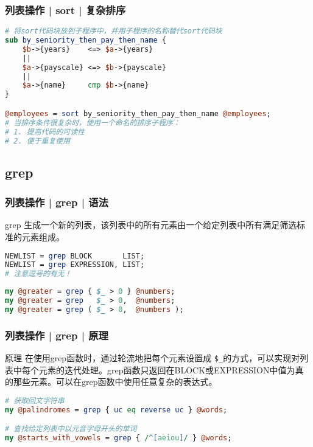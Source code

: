 \begin{frame}[fragile]
  \frametitle{列表操作 | sort | 复杂排序}
\begin{lstlisting}[language=Perl]
# 将sort代码块放到子程序中，并用子程序的名称替代sort代码块
sub by_seniority_then_pay_then_name {
    $b->{years}    <=> $a->{years}
    ||
    $a->{payscale} <=> $b->{payscale}
    ||
    $a->{name}     cmp $b->{name}
}

@employees = sort by_seniority_then_pay_then_name @employees;
# 当排序条件很复杂时，使用一个命名的排序子程序：
# 1. 提高代码的可读性
# 2. 便于重复使用
\end{lstlisting}
\end{frame}

\subsection{grep}
\begin{frame}[fragile]
  \frametitle{列表操作 | grep | \alert{语法}}
  \begin{block}{grep}
    生成一个新的列表，该列表中的所有元素由一个给定列表中所有满足筛选标准的元素组成。 
  \end{block}
\begin{lstlisting}[language=Perl]
NEWLIST = grep BLOCK       LIST;
NEWLIST = grep EXPRESSION, LIST;
# 注意逗号的有无！
\end{lstlisting}
\pause
\begin{lstlisting}[language=Perl]
my @greater = grep { $_ > 0 } @numbers;
my @greater = grep   $_ > 0,  @numbers;
my @greater = grep ( $_ > 0,  @numbers );
\end{lstlisting}
\end{frame}

\begin{frame}[fragile]
  \frametitle{列表操作 | grep | 原理}
  \begin{block}{原理}
    在使用grep函数时，通过轮流地把每个元素设置成 \verb|$_|的方式，可以实现对列表中每个元素的迭代处理。grep函数只返回在BLOCK或EXPRESSION中值为真的那些元素。可以在grep函数中使用任意复杂的表达式。
  \end{block}
\begin{lstlisting}[language=Perl]
# 获取回文字符串
my @palindromes = grep { uc eq reverse uc } @words;

# 查找给定列表中以元音字母开头的单词
my @starts_with_vowels = grep { /^[aeiou]/ } @words;
\end{lstlisting}
\end{frame}

